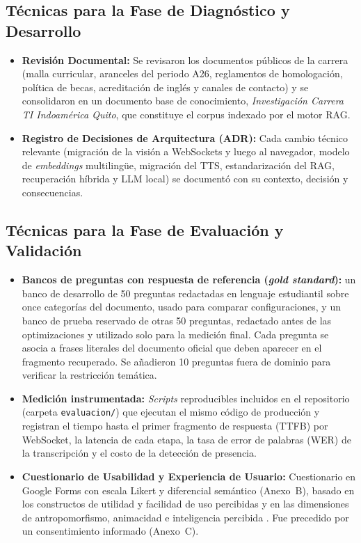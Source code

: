 \subsection{Técnicas para la Fase de Diagnóstico y Desarrollo}
\begin{itemize}
    \item \textbf{Revisión Documental:} Se revisaron los documentos públicos de la carrera (malla curricular, aranceles del periodo A26, reglamentos de homologación, política de becas, acreditación de inglés y canales de contacto) y se consolidaron en un documento base de conocimiento, \textit{Investigación Carrera TI Indoamérica Quito}, que constituye el corpus indexado por el motor RAG.
    \item \textbf{Registro de Decisiones de Arquitectura (ADR):} Cada cambio técnico relevante (migración de la visión a WebSockets y luego al navegador, modelo de \textit{embeddings} multilingüe, migración del TTS, estandarización del RAG, recuperación híbrida y LLM local) se documentó con su contexto, decisión y consecuencias.
\end{itemize}

\subsection{Técnicas para la Fase de Evaluación y Validación}
\begin{itemize}
    \item \textbf{Bancos de preguntas con respuesta de referencia (\textit{gold standard}):} un banco de desarrollo de 50 preguntas redactadas en lenguaje estudiantil sobre once categorías del documento, usado para comparar configuraciones, y un banco de prueba reservado de otras 50 preguntas, redactado antes de las optimizaciones y utilizado solo para la medición final. Cada pregunta se asocia a frases literales del documento oficial que deben aparecer en el fragmento recuperado. Se añadieron 10 preguntas fuera de dominio para verificar la restricción temática.
    \item \textbf{Medición instrumentada:} \textit{Scripts} reproducibles incluidos en el repositorio (carpeta \texttt{evaluacion/}) que ejecutan el mismo código de producción y registran el tiempo hasta el primer fragmento de respuesta (TTFB) por WebSocket, la latencia de cada etapa, la tasa de error de palabras (WER) de la transcripción y el costo de la detección de presencia.
    \item \textbf{Cuestionario de Usabilidad y Experiencia de Usuario:} Cuestionario en Google Forms con escala Likert y diferencial semántico (Anexo~B), basado en los constructos de utilidad y facilidad de uso percibidas \cite{davis1989tam} y en las dimensiones de antropomorfismo, animacidad e inteligencia percibida \cite{bartneck2009godspeed}. Fue precedido por un consentimiento informado (Anexo~C).
\end{itemize}

